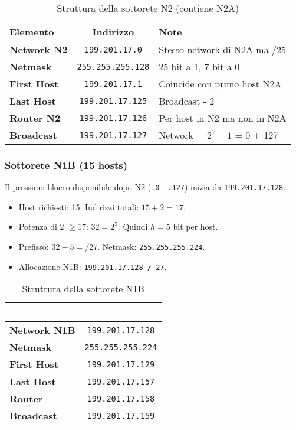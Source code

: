 \begin{table}[h]
\centering
\begin{tabular}{|l|c|l|}
\hline
\rowcolor{bg_custom}
\textcolor{primarytext}{\textbf{Elemento}} & \textcolor{primarytext}{\textbf{Indirizzo}} & \textcolor{primarytext}{\textbf{Note}} \\
\hline
\textbf{Network N2} & \texttt{199.201.17.0} & Stesso network di N2A ma /25 \\
\hline
\textbf{Netmask} & \texttt{255.255.255.128} & 25 bit a 1, 7 bit a 0 \\
\hline
\textbf{First Host} & \texttt{199.201.17.1} & Coincide con primo host N2A \\
\hline
\textbf{Last Host} & \texttt{199.201.17.125} & Broadcast - 2 \\
\hline
\textbf{Router N2} & \texttt{199.201.17.126} & Per host in N2 ma non in N2A \\
\hline
\textbf{Broadcast} & \texttt{199.201.17.127} & Network + $2^7 - 1$ = 0 + 127 \\
\hline
\end{tabular}
\caption{Struttura della sottorete N2 (contiene N2A)}
\end{table}

\subsubsection{Sottorete N1B (15 hosts)}
Il prossimo blocco disponibile dopo N2 (\texttt{.0} - \texttt{.127}) inizia da \texttt{199.201.17.128}.
\begin{itemize}
    \item Host richiesti: 15. Indirizzi totali: $15 + 2 = 17$.
    \item Potenza di 2 $\geq 17$: $32 = 2^5$. Quindi $h=5$ bit per host.
    \item Prefisso: $32 - 5 = /27$. Netmask: \texttt{255.255.255.224}.
    \item Allocazione N1B: \texttt{199.201.17.128 / 27}.
\end{itemize}

\begin{table}[h]
\centering
\begin{tabular}{|l|c|}
\hline
\rowcolor{bg_custom}
\textcolor{white}{\textbf{Elemento}} & \textcolor{white}{\textbf{Indirizzo}} \\
\hline
\textbf{Network N1B} & \texttt{199.201.17.128} \\
\hline
\textbf{Netmask} & \texttt{255.255.255.224} \\
\hline
\textbf{First Host} & \texttt{199.201.17.129} \\
\hline
\textbf{Last Host} & \texttt{199.201.17.157} \\
\hline
\textbf{Router} & \texttt{199.201.17.158} \\
\hline
\textbf{Broadcast} & \texttt{199.201.17.159} \\
\hline
\end{tabular}
\caption{Struttura della sottorete N1B}
\end{table}

